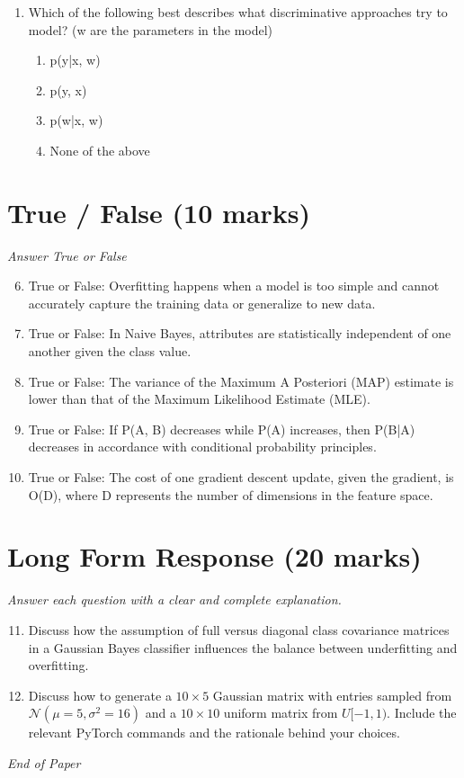 \documentclass[12pt]{article}
\begin{document}
\begin{enumerate}[label=\arabic*.]
\begin{enumerate}[label=(\alph*)]
    \item P(X, Y, Z) = P(X) * P(Y|X) * P(Z|Y)
    \item P(X, Y, Z) = P(Z) * P(X|Z) * P(Y|Z)
    \item P(X, Y, Z) = P(X) * P(Y) * P(Z)
\end{enumerate}
\item Which of the following best describes what discriminative approaches try to model? (w are the parameters in the model)
\begin{enumerate}[label=(\alph*)]
    \item p(y|x, w)
    \item p(y, x)
    \item p(w|x, w)
    \item None of the above
\end{enumerate}
\end{enumerate}

\section*{True / False (10 marks)}
\textit{Answer True or False}
\begin{enumerate}[label=\arabic*.]
\setcounter{enumi}{5}
\item True or False: Overfitting happens when a model is too simple and cannot accurately capture the training data or generalize to new data.
\item True or False: In Naive Bayes, attributes are statistically independent of one another given the class value.
\item True or False: The variance of the Maximum A Posteriori (MAP) estimate is lower than that of the Maximum Likelihood Estimate (MLE).
\item True or False: If P(A, B) decreases while P(A) increases, then P(B|A) decreases in accordance with conditional probability principles.
\item True or False: The cost of one gradient descent update, given the gradient, is O(D), where D represents the number of dimensions in the feature space.
\end{enumerate}

\section*{Long Form Response (20 marks)}
\textit{Answer each question with a clear and complete explanation.}
\begin{enumerate}[label=\arabic*.]
\setcounter{enumi}{10}
\item Discuss how the assumption of full versus diagonal class covariance matrices in a Gaussian Bayes classifier influences the balance between underfitting and overfitting.
\item Discuss how to generate a $10\times 5$ Gaussian matrix with entries sampled from $\mathcal{N}(\mu=5,\sigma^2=16)$ and a $10\times 10$ uniform matrix from $U[-1,1)$. Include the relevant PyTorch commands and the rationale behind your choices.
\end{enumerate}

\vfill
\noindent\textit{End of Paper}
\end{document}
